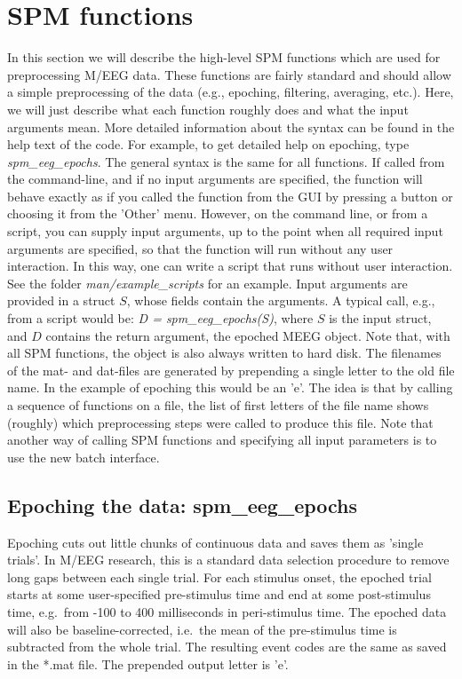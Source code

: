 \section{SPM functions}
In this section we will describe the high-level SPM functions which
are used for preprocessing M/EEG data. These functions are fairly
standard and should allow a simple preprocessing of the data (e.g.,
epoching, filtering, averaging, etc.). Here, we will just describe
what each function roughly does and what the input arguments mean. More detailed information about the
syntax can be found in the help text of the code. For example, to get detailed help on epoching, type
\textit{spm\_eeg\_epochs}. The general syntax is the same for all
functions. If called from the command-line, and if no input arguments
are specified, the function will behave exactly as if you called the
function from the GUI by pressing a button or choosing it from the 'Other' menu. However, on the command line, or from a script,
you can supply input arguments, up to the point when all required input
arguments are specified, so that the function will run without any user
interaction. In this way, one can write a script that runs without
user interaction. See the folder \textit{man/example\_scripts} for an example. Input
arguments are provided in a struct $S$, whose 
fields contain the arguments. A typical call, e.g., from a script
would be: \textit{D = spm\_eeg\_epochs(S)}, where $S$ is the input
struct, and $D$ contains the return argument, the epoched MEEG object. Note that, with all SPM
functions, the object is also always written to hard disk. The filenames of the mat- and dat-files 
are generated by prepending a single letter to the old file
name. In the example of epoching this would be an 'e'. The idea is that
by calling a sequence of functions on a file, the list of first
letters of the file name shows (roughly) which preprocessing steps were
called to produce this file. Note that another way of calling SPM
functions and specifying all input parameters is to use the new batch
interface.

\subsection{Epoching the data: spm\_eeg\_epochs}
Epoching cuts out little chunks of continuous data and saves them as
'single trials'. In M/EEG research, this is a standard data selection
procedure to remove long gaps between each single trial. For each
stimulus onset, the epoched trial starts at some user-specified
pre-stimulus time and 
end at some post-stimulus time, e.g.~from -100 to 400 milliseconds in
peri-stimulus time. The epoched data will also be baseline-corrected,
i.e.~the mean of the pre-stimulus time is subtracted from the whole
trial. The resulting event codes are the same as saved in the *.mat
file. The prepended output letter is 'e'.

